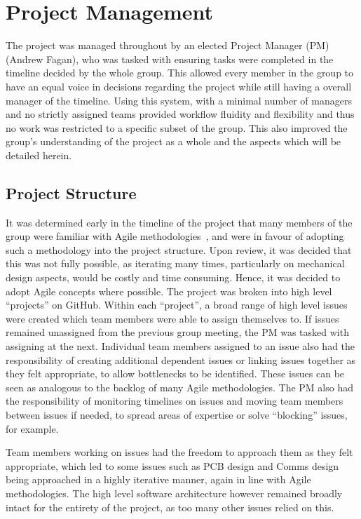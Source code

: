 \chapter{Project Management}\label{pm}

The project was managed throughout by an elected Project Manager (PM) 
(Andrew Fagan), who was tasked with ensuring tasks were 
completed in the timeline decided by the whole group. This 
allowed every member in the group to have an equal voice in 
decisions regarding the project while still having a overall 
manager of the timeline. Using this system, with a minimal 
number of managers and no strictly assigned teams provided
workflow fluidity and flexibility and thus no work was restricted 
to a specific subset of the group. This also improved the 
group's understanding of the project as a whole and the aspects 
which will be detailed herein. 

\section{Project Structure}\label{pm/structure}

It was determined early in the timeline of the project that many members of the 
group were familiar with Agile methodologies~\cite{agilemeth}, and were in favour of 
adopting such a methodology into the project structure. Upon review, it was 
decided that this was not fully possible, as iterating many times, particularly on 
mechanical design aspects, would be costly and time consuming. Hence, it was 
decided to adopt Agile concepts where possible. The project was broken into high 
level ``projects'' on GitHub. Within each ``project'', a broad range of high level 
issues were created which team members were able to assign themselves to. If 
issues remained unassigned from the previous group meeting, the PM was tasked with 
assigning at the next. Individual team members assigned to an issue also had the 
responsibility of creating additional dependent issues or linking issues together 
as they felt appropriate, to allow bottlenecks to be identified. These issues can 
be seen as analogous to the backlog of many Agile methodologies. The PM also had 
the responsibility of monitoring timelines on issues and moving team members 
between issues if needed, to spread areas of expertise or solve ``blocking'' 
issues, for example.

Team members working on issues had the freedom to approach them as they felt 
appropriate, which led to some issues such as PCB design and Comms design being 
approached in a highly iterative manner, again in line with Agile methodologies. 
The high level software architecture however remained broadly intact for the 
entirety of the project, as too many other issues relied on this.

